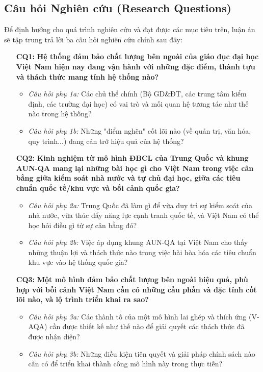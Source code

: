 \documentclass[12pt, a4paper, openany]{report}
\begin{document}
\subsection{Câu hỏi Nghiên cứu (Research Questions)}
\label{subsec:cau_hoi_nghien_cuu}

Để định hướng cho quá trình nghiên cứu và đạt được các mục tiêu trên, luận án sẽ tập trung trả lời ba câu hỏi nghiên cứu chính sau đây:

\begin{enumerate}
    \item[\textbf{CQ1:}] \textbf{Hệ thống đảm bảo chất lượng bên ngoài của giáo dục đại học Việt Nam hiện nay đang vận hành với những đặc điểm, thành tựu và thách thức mang tính hệ thống nào?}
    \begin{itemize}
        \item \textit{Câu hỏi phụ 1a:} Các chủ thể chính (Bộ GD\&ĐT, các trung tâm kiểm định, các trường đại học) có vai trò và mối quan hệ tương tác như thế nào trong hệ thống?
        \item \textit{Câu hỏi phụ 1b:} Những "điểm nghẽn" cốt lõi nào (về quản trị, văn hóa, quy trình...) đang cản trở hiệu quả của hệ thống?
    \end{itemize}

    \item[\textbf{CQ2:}] \textbf{Kinh nghiệm từ mô hình ĐBCL của Trung Quốc và khung AUN-QA mang lại những bài học gì cho Việt Nam trong việc cân bằng giữa kiểm soát nhà nước và tự chủ đại học, giữa các tiêu chuẩn quốc tế/khu vực và bối cảnh quốc gia?}
    \begin{itemize}
        \item \textit{Câu hỏi phụ 2a:} Trung Quốc đã làm gì để vừa duy trì sự kiểm soát của nhà nước, vừa thúc đẩy năng lực cạnh tranh quốc tế, và Việt Nam có thể học hỏi điều gì từ sự cân bằng đó?
        \item \textit{Câu hỏi phụ 2b:} Việc áp dụng khung AUN-QA tại Việt Nam cho thấy những thuận lợi và thách thức nào trong việc hài hòa hóa các tiêu chuẩn khu vực vào hệ thống quốc gia?
    \end{itemize}

    \item[\textbf{CQ3:}] \textbf{Một mô hình đảm bảo chất lượng bên ngoài hiệu quả, phù hợp với bối cảnh Việt Nam cần có những cấu phần và đặc tính cốt lõi nào, và lộ trình triển khai ra sao?}
    \begin{itemize}
        \item \textit{Câu hỏi phụ 3a:} Các thành tố của một mô hình lai ghép và thích ứng (V-AQA) cần được thiết kế như thế nào để giải quyết các thách thức đã được nhận diện?
        \item \textit{Câu hỏi phụ 3b:} Những điều kiện tiên quyết và giải pháp chính sách nào cần có để triển khai thành công mô hình này trong thực tiễn?
    \end{itemize}
\end{enumerate}
\end{document}
